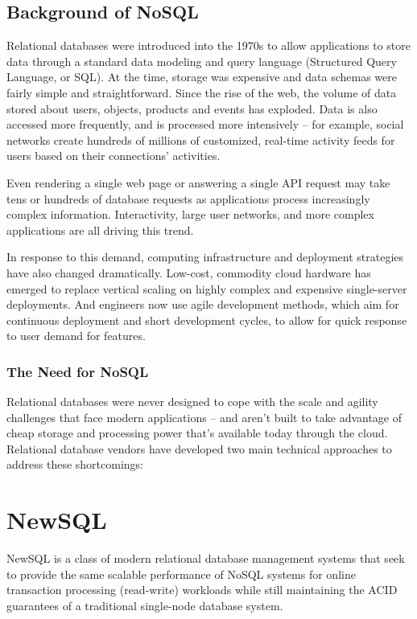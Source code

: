 \documentclass[11pt]{article} %
\begin{document}
\subsection{Background of NoSQL}
Relational databases were introduced into the 1970s to allow applications to store data through a standard data modeling and query language (Structured Query Language, or SQL). At the time, storage was expensive and data schemas were fairly simple and straightforward. Since the rise of the web, the volume of data stored about users, objects, products and events has exploded. Data is also accessed more frequently, and is processed more intensively – for example, social networks create hundreds of millions of customized, real-time activity feeds for users based on their connections' activities.

Even rendering a single web page or answering a single API request may take tens or hundreds of database requests as applications process increasingly complex information. Interactivity, large user networks, and more complex applications are all driving this trend.

In response to this demand, computing infrastructure and deployment strategies have also changed dramatically. Low-cost, commodity cloud hardware has emerged to replace vertical scaling on highly complex and expensive single-server deployments. And engineers now use agile development methods, which aim for continuous deployment and short development cycles, to allow for quick response to user demand for features.

\subsubsection{The Need for NoSQL}

Relational databases were never designed to cope with the scale and agility challenges that face modern applications – and aren't built to take advantage of cheap storage and processing power that's available today through the cloud. Relational database vendors have developed two main technical approaches to address these shortcomings:

\newpage
\section{NewSQL}
NewSQL is a class of modern relational database management systems that seek to provide the same scalable performance of NoSQL systems for online transaction processing (read-write) workloads while still maintaining the ACID guarantees of a traditional single-node database system.
\end{document}
